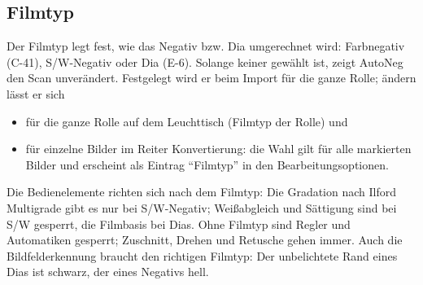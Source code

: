 \documentclass[a4paper,11pt,parskip=half,DIV=12]{scrartcl}
\newcommand{\menu}[1]{\textsf{#1}}                    %
\begin{document}
\subsection{Filmtyp}
Der Filmtyp legt fest, wie das Negativ bzw. Dia umgerechnet wird: \menu{Farbnegativ} (C-41),
\menu{S/W-Negativ} oder \menu{Dia} (E-6). Solange keiner gewählt ist, zeigt AutoNeg den Scan
unverändert. Festgelegt wird er beim Import für die ganze Rolle; ändern lässt er sich
\begin{itemize}
  \item für die ganze Rolle auf dem Leuchttisch (\menu{Filmtyp der Rolle}) und
  \item für einzelne Bilder im Reiter \menu{Konvertierung}: die Wahl gilt für alle markierten
        Bilder und erscheint als Eintrag \enquote{Filmtyp} in den Bearbeitungsoptionen.
\end{itemize}
Die Bedienelemente richten sich nach dem Filmtyp: Die \menu{Gradation} nach Ilford Multigrade
gibt es nur bei S/W-Negativ; Weißabgleich und Sättigung sind bei S/W gesperrt, die Filmbasis bei
Dias. Ohne Filmtyp sind Regler und Automatiken gesperrt; Zuschnitt, Drehen und Retusche gehen
immer. Auch die Bildfelderkennung braucht den richtigen Filmtyp: Der unbelichtete Rand eines
Dias ist schwarz, der eines Negativs hell.
\end{document}
